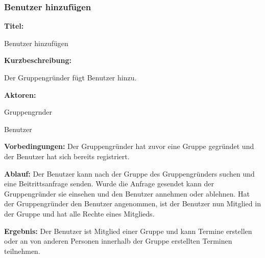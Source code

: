 \documentclass{scrartcl}
\begin{document}
	\subsubsection{Benutzer hinzufügen}
	\begin{description}
		\item \textbf{Titel:}
		\begin{description}
			\item Benutzer hinzufügen
		\end{description}
		\item \textbf{Kurzbeschreibung:}
		\begin{description}
			\item Der Gruppengründer fügt Benutzer hinzu.
		\end{description}
		\item \textbf{Aktoren:}
		\begin{description}
			\item \gls{Gruppengrnder}
			\item Benutzer
		\end{description}
		\item \textbf{Vorbedingungen:} \newline Der Gruppengründer hat zuvor eine Gruppe gegründet und der Benutzer hat sich bereits registriert.
		\item \textbf{Ablauf:} \newline Der Benutzer kann nach der Gruppe des Gruppengründers suchen und eine Beitrittsanfrage senden. Wurde die Anfrage gesendet kann der Gruppengründer sie einsehen und den Benutzer annehmen oder ablehnen. Hat der Gruppengründer den Benutzer angenommen, ist der Benutzer nun \gls{Mitglied} in der Gruppe und hat alle Rechte eines Mitglieds.
		\item \textbf{Ergebnis:} \newline Der Benutzer ist Mitglied einer Gruppe und kann Termine erstellen oder an von anderen Personen innerhalb der Gruppe erstellten Terminen teilnehmen.
	\end{description}
	
	\newpage
	
\end{document}
